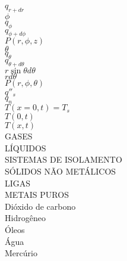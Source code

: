 $q_{r+dr}$ \\


$\phi$ \\

$q_{\phi}$ \\

$q_{\phi+d\phi}$ \\

$P(r,\phi,z)$ \\

$\theta$ \\

$q_{\theta}$ \\

$q_{\theta+d\theta}$ \\

$r\sin\theta d\theta$ \\

$rd\theta$ \\

$P(r,\phi, \theta)$ \\

$q''_s$ \\ 

$q_n$ \\ 

$T(x=0,t) = T_s$ \\

$T(0,t)$ \\ 

$T(x,t)$ \\ 


GASES \\

LÍQUIDOS \\

SISTEMAS DE ISOLAMENTO \\

SÓLIDOS NÃO METÁLICOS \\

LIGAS \\

METAIS PUROS \\

Dióxido de carbono \\

Hidrogêneo \\

Óleos \\ 

Água \\ 

Mercúrio \\

